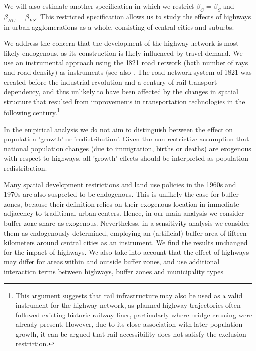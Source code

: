 \documentclass[a4paper,authoryear,review]{elsarticle}  	%
\begin{document}
	 We will also estimate another specification in which we restrict $\beta_{C}=\beta_{S}$ and $\beta_{HC}=\beta_{HS}$. This restricted specification allows us to study the effects of highways in urban agglomerations as a whole, consisting of central cities and suburbs. 
	
	We address the concern that the development of the highway network is most likely endogenous, as its construction is likely influenced by travel demand. We use an instrumental approach using the 1821 road network (both number of rays and road density) as instruments (see also \citet{Baum-Snow2007,Baum-Snow2007a,Baum-Snow2012,Duranton2012b,Garcia-Lopez2012,Garcia-Lopez2015,Pasidis2015}.
	The road network system of 1821 was created before the industrial revolution and a century of rail-transport dependency, and thus unlikely to have been affected by the changes in spatial structure that resulted from improvements in transportation technologies in the following century.\footnote{This argument suggests that rail infrastructure may also be used as a valid instrument for the highway network, as planned highway trajectories often followed existing historic railway lines, particularly where bridge crossing were already present. However, due to its close association with later population growth, it can be argued that rail accessibility does not satisfy the exclusion restriction.}
	
	In the empirical analysis we do not aim to distinguish between the effect on population 'growth' or 'redistribution'. Given the non-restrictive assumption that national population changes (due to immigration, births or deaths) are exogenous with respect to highways, all 'growth' effects should be interpreted as population redistribution.

	Many spatial development restrictions and land use policies in the 1960s and 1970s are also suspected to be endogenous. This is unlikely the case for buffer zones, because their definition relies on their exogenous location in immediate adjacency to traditional urban centers. Hence, in our main analysis we consider buffer zone share as exogenous. 
	Nevertheless, in a sensitivity analysis we consider them as endogenously determined, employing an (artificial) buffer area of fifteen kilometers around central cities as an instrument. We find the results unchanged for the impact of highways.
	We also take into account that the effect of highways may differ for areas within and outside buffer zones, and use additional interaction terms between highways, buffer zones and municipality types.	
	
\end{document}
